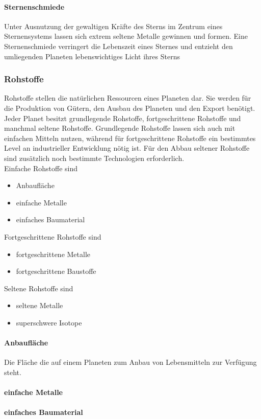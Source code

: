 \documentclass[11pt, a4paper]{article}
\begin{document}
\paragraph{Sternenschmiede}
Unter Ausnutzung der gewaltigen Kräfte des Sterns im Zentrum eines Sternensystems lassen sich extrem seltene
Metalle gewinnen und formen. Eine Sternenschmiede verringert die Lebenszeit eines Sternes und entzieht den
umliegenden Planeten lebenswichtiges Licht ihres Sterns
%
\subsubsection{Rohstoffe}
Rohstoffe stellen die natürlichen Ressourcen eines Planeten dar. Sie werden für die Produktion von Gütern,
den Ausbau des Planeten und den Export benötigt. Jeder Planet besitzt grundlegende Rohstoffe, fortgeschrittene
Rohstoffe und manchmal seltene Rohstoffe. Grundlegende Rohstoffe lassen sich auch mit einfachen Mitteln
nutzen, während für fortgeschrittene Rohstoffe ein bestimmtes Level an industrieller Entwicklung nötig ist.
Für den Abbau seltener Rohstoffe sind zusätzlich noch bestimmte Technologien erforderlich.
\\
Einfache Rohstoffe sind
\begin{itemize}
	\item Anbaufläche
	\item einfache Metalle
	\item einfaches Baumaterial
\end{itemize}
%
Fortgeschrittene Rohstoffe sind
\begin{itemize}
	\item fortgeschrittene Metalle
	\item fortgeschrittene Baustoffe
\end{itemize}
%
Seltene Rohstoffe sind
\begin{itemize}
	\item seltene Metalle
	\item superschwere Isotope
\end{itemize}
%
\paragraph{Anbaufläche}
Die Fläche die auf einem Planeten zum Anbau von Lebensmitteln zur Verfügung steht.
%
\paragraph{einfache Metalle}
%
\paragraph{einfaches Baumaterial}
%
\end{document}
